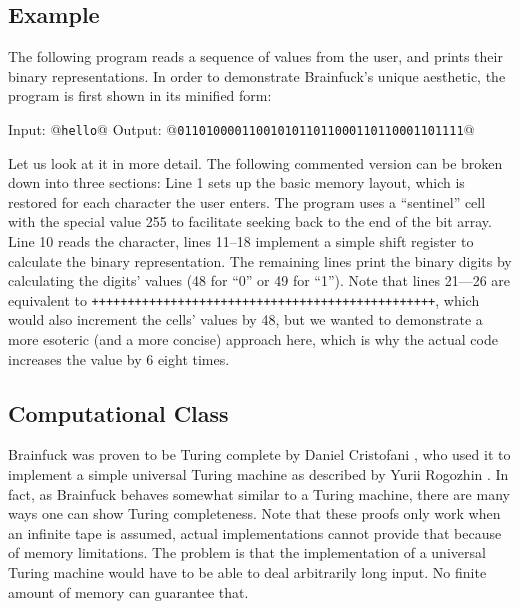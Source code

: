 \subsection{Example}

The following program reads a sequence of \ascii{} values from the user, and prints their binary representations. In order to demonstrate Brainfuck's unique aesthetic, the program is first shown in its minified form:



\begin{io}
Input: @\texttt{hello}@
Output: @\texttt{0110100001100101011011000110110001101111}@
\end{io}

Let us look at it in more detail. The following commented version can be broken down into three sections: Line 1 sets up the basic memory layout, which is restored for each character the user enters. The program uses a “sentinel” cell with the special value 255 to facilitate seeking back to the end of the bit array. Line 10 reads the character, lines 11--18 implement a simple shift register to calculate the binary representation. The remaining lines print the binary digits by calculating the digits' \ascii{} values (48 for “0” or 49 for “1”). Note that lines 21---26 are equivalent to \texttt{++++++++++++++++++++++++++++++++++++++++++++++++}, which would also increment the cells' values by 48, but we wanted to demonstrate a more esoteric (and a more concise) approach here, which is why the actual code increases the value by 6 eight times.




\subsection{Computational Class}

Brainfuck was proven to be Turing complete by Daniel Cristofani \cite{cristofani_universal}, who used it to implement a simple universal Turing machine as described by Yurii Rogozhin \cite{rogozhin1996small}. In fact, as Brainfuck behaves somewhat similar to a Turing machine, there are many ways one can show Turing completeness. Note that these proofs only work when an infinite tape is assumed, actual implementations cannot provide that because of memory limitations. The problem is that the implementation of a universal Turing machine would have to be able to deal arbitrarily long input. No finite amount of memory can guarantee that.


